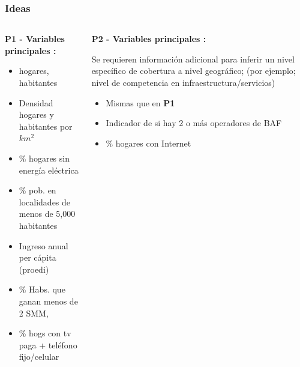 \documentclass[xcolor=dvipsnames, compress]{beamer}
\begin{document}
\begin{frame}
\frametitle{Ideas}
\begin{columns}
	\begin{column}{0.5\textwidth}  %
		\textbf{P1 - Variables principales :}
		\begin{itemize}
			\item hogares, habitantes
			\item Densidad hogares y habitantes por $km^2$
			\item \% hogares sin energía eléctrica
			\item \% pob. en localidades de menos de 5,000 habitantes
			\item Ingreso anual per cápita (proedi)
			\item \% Habs. que ganan menos de 2 SMM,
			\item \% hogs con tv paga + teléfono fijo/celular
		\end{itemize}
		
	\end{column}
	\begin{column}{0.5\textwidth}

		\textbf{P2 - Variables principales :}
		
		Se requieren información adicional para inferir un nivel específico de cobertura a nivel geográfico; (por ejemplo; nivel de competencia en infraestructura/servicios)
\begin{itemize}
	\item Mismas que en \textbf{P1}
	\item Indicador de si hay 2 o más operadores de BAF
	\item \% hogares con Internet

\end{itemize}	
		
	\end{column}
\end{columns}

\end{frame}
\end{document}
